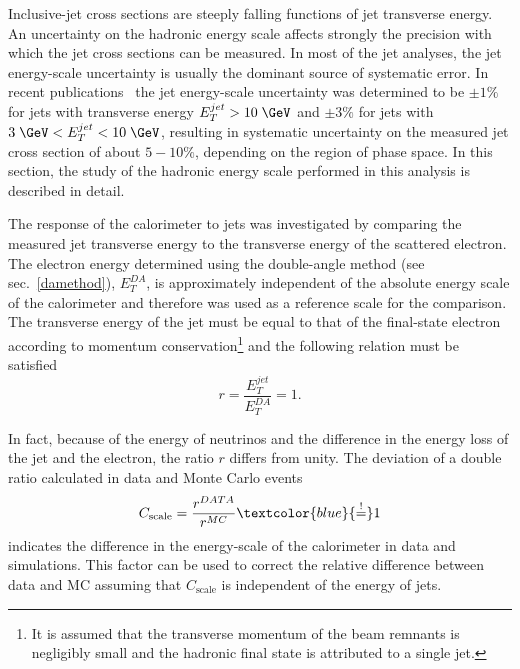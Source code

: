 Inclusive-jet cross sections are steeply falling functions of jet transverse energy. An uncertainty on the hadronic energy scale affects strongly the precision with which the jet cross sections can be measured. In most of the jet analyses, the jet energy-scale uncertainty is usually the dominant source of systematic error. In recent \zeus publications~\cite{epj:c70:965, np:b864:1} the jet energy-scale uncertainty was determined to be $\pm 1\%$ for jets with transverse energy $\etjet>10\; \GeV$ and $\pm 3\%$ for jets with $3\; \GeV<\etjet < 10\; \GeV$, resulting in systematic uncertainty on the measured jet cross section of about $5-10\%$, depending on the region of phase space. In this section, the study of the hadronic energy scale performed in this analysis is described in detail.

The response of the calorimeter to jets was investigated by comparing the measured jet transverse energy to the transverse energy of the scattered electron. The electron energy determined using the double-angle method (see sec.~\ref{damethod}), $E_T^{DA}$, is approximately independent of the absolute energy scale of the calorimeter and therefore was used as a reference scale for the comparison. The transverse energy of the jet must be equal to that of the final-state electron according to momentum conservation\footnote{It is assumed that the transverse momentum of the beam remnants is negligibly small and the hadronic final state is attributed to a single jet.} and the following relation must be satisfied
\begin{equation}
r = \frac{E_T^{jet}}{E_T^{DA}} = 1.
\label{eq:etjetetelbalance}
\end{equation}

In fact, because of the energy of neutrinos and the difference in the energy loss of the jet and the electron, the ratio $r$ differs from unity. The deviation of a double ratio calculated in data and Monte Carlo events
\begin{equation}
C_\text{scale} = \frac{r^{DATA}}{r^{MC}} \textcolor{blue}{\stackrel{!}{=}} 1
\label{eq:cscale}
\end{equation}
indicates the difference in the energy-scale of the calorimeter in data and simulations. This factor can be used to correct the relative difference between data and MC assuming that $C_\text{scale}$ is independent of the energy of jets. 

